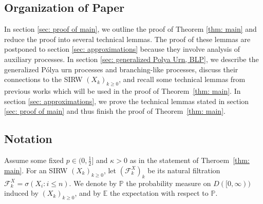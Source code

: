 \documentclass[twoside,12pt, a4paper]{article}
\numberwithin{equation}{section}
\theoremstyle{remark}
\begin{document}
	\subsection{Organization of Paper}
	In section \ref{sec: proof of main}, we outline the proof of Theorem \ref{thm: main} and reduce the proof into several technical lemmas. The proof of these lemmas are postponed to section \ref{sec: approximations} because they involve analysis of auxiliary processes. In section \ref{sec: generalized Polya Urn, BLP}, we describe the generalized P\'{o}lya urn processes and branching-like processes, discuss their connections to the SIRW $(X_k)_{k\geq 0}$, and recall some technical lemmas from previous works which will be used in the proof of Theorem~\ref{thm: main}. In section \ref{sec: approximations}, we prove the technical lemmas stated in section \ref{sec: proof of main} and thus finish the proof of Theorem~\ref{thm: main}. 
	
	\subsection{Notation}
	
	Assume some fixed $p \in (0,\frac{1}{2}]$ and $\kappa > 0$ as in the statement of Theroem~\ref{thm: main}. For an SIRW $(X_k)_{k\geq 0}$, let $(\mathcal{F}^X_k)_k$ be its natural filtration $\mathcal{F}^X_k = \sigma\left(X_i: i\leq n \right).$ 
	We denote by $\mathbb{P}$ the probability measure on $D([0,\infty))$ induced by $(X_k)_{k\geq 0}$, and by $\mathbb{E}$ the expectation with respect to $\mathbb{P}$.
	
\end{document}
